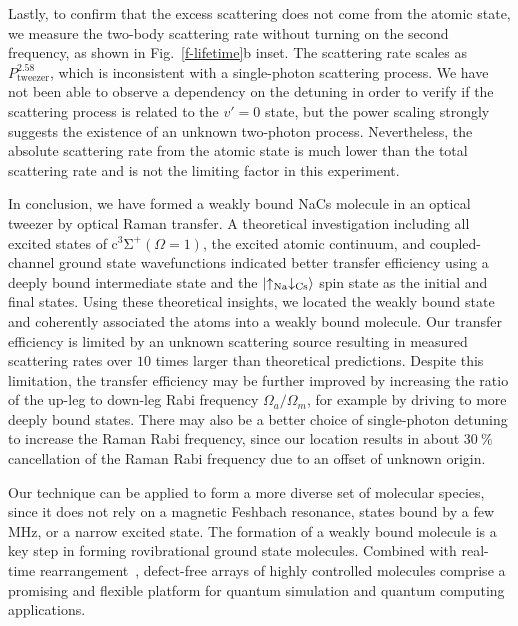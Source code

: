 \documentclass[aps,prl,twocolumn,10pt,superscriptaddress]{revtex4-1}
\newcommand{\Na}{\mathrm{Na}}
\newcommand{\Cs}{\mathrm{Cs}}
\newcommand{\todo}[1]{}
\begin{document}
Lastly, to confirm that the excess scattering does not come from the atomic state,
we measure the two-body scattering rate
without turning on the second frequency, as shown in Fig.~\ref{f-lifetime}b inset.
The scattering rate scales as $P_{\mathrm{tweezer}}^{2.58}$,
which is inconsistent with a single-photon scattering process.
We have not been able to observe a dependency on the detuning in order to verify
if the scattering process is related to the $v'=0$ state,
but the power scaling strongly suggests the existence of an unknown two-photon process.
Nevertheless, the absolute scattering rate from the atomic state
is much lower than the total scattering rate
and is not the limiting factor in this experiment.

In conclusion, we have formed a weakly bound NaCs molecule in an optical tweezer
by optical Raman transfer.
A theoretical investigation including all excited states of $\mathrm{c^3\Sigma^+}(\Omega = 1)$,
the excited atomic continuum, and coupled-channel ground state wavefunctions indicated
better transfer efficiency using a deeply bound intermediate state
and the $\ket{\uparrow_{\Na} \downarrow_{\Cs} }$ spin state as the initial and final states.
Using these theoretical insights, we located the weakly bound state
and coherently associated the atoms into a weakly bound molecule.
Our transfer efficiency is limited by an unknown scattering source
resulting in measured scattering rates over $10$ times larger than theoretical predictions.
Despite this limitation, the transfer efficiency may be further improved
by increasing the ratio of the up-leg to down-leg Rabi frequency
$\Omega_a/\Omega_m$, for example by driving to more deeply bound states.
There may also be a better choice of single-photon detuning to increase the Raman Rabi frequency,
since our location results in about $30~\mathrm{\%}$ cancellation of the Raman Rabi frequency
due to an offset of unknown origin.

Our technique can be applied to form a more diverse set of molecular species,
since it does not rely on a magnetic Feshbach resonance, states bound by a few MHz,
or a narrow excited state. The formation of a weakly bound molecule is a key step
in forming rovibrational ground state molecules.
Combined with real-time rearrangement~\cite{Barredo2016, Endres2016},
defect-free arrays of highly controlled molecules comprise a promising
and flexible platform for quantum simulation and quantum computing applications.

\todo{sm: STIRAP vs Raman}
\end{document}
